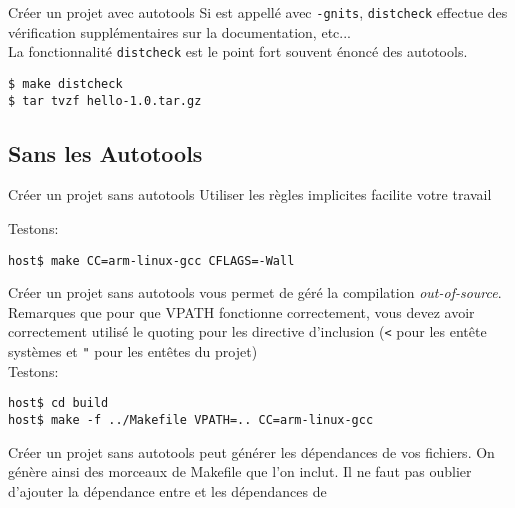 \begin{frame}[fragile=singleslide]{Créer un projet avec autotools}
  Si   est appellé avec  \verb+-gnits+, \verb+distcheck+
  effectue des vérification supplémentaires sur la documentation,
  etc... 
  \\[2ex]
  La fonctionnalité \verb+distcheck+ est  le point fort souvent énoncé
  des autotools.
\begin{lstlisting}
$ make distcheck
$ tar tvzf hello-1.0.tar.gz
\end{lstlisting} %
\end{frame}

\subsection{Sans les Autotools}

\begin{frame}[fragile=singleslide]{Créer un projet sans autotools}
  Utiliser les règles implicites facilite votre travail
  
  Testons:
\begin{lstlisting}
host$ make CC=arm-linux-gcc CFLAGS=-Wall
\end{lstlisting} %
\end{frame}

\begin{frame}[fragile=singleslide]{Créer un projet sans autotools}
   vous permet de géré la compilation \emph{out-of-source}.
  Remarques que pour que VPATH fonctionne correctement, vous devez avoir
  correctement utilisé le quoting pour les directive d'inclusion (\verb+<+ pour
  les entête systèmes et \verb+"+ pour les entêtes du projet)
%  
  \\[2ex] 
  Testons:
\begin{lstlisting}
host$ cd build
host$ make -f ../Makefile VPATH=.. CC=arm-linux-gcc 
\end{lstlisting} %
\end{frame}

\begin{frame}[fragile=singleslide]{Créer un projet sans autotools}
   peut  générer les dépendances de vos  fichiers.  On génère
  ainsi  des morceaux  de Makefile  que l'on  inclut. Il  ne  faut pas
  oublier   d'ajouter  la  dépendance   entre     et  les
  dépendances de 
  
\end{frame}

